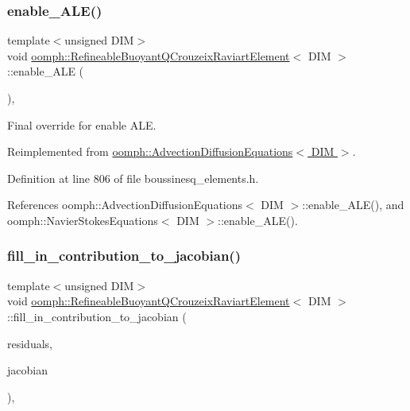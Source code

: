\subsubsection{\texorpdfstring{enable\+\_\+\+A\+L\+E()}{enable\_ALE()}}
{\footnotesize\ttfamily template$<$unsigned D\+IM$>$ \\
void \hyperlink{classoomph_1_1RefineableBuoyantQCrouzeixRaviartElement}{oomph\+::\+Refineable\+Buoyant\+Q\+Crouzeix\+Raviart\+Element}$<$ D\+IM $>$\+::enable\+\_\+\+A\+LE (\begin{DoxyParamCaption}{ }\end{DoxyParamCaption})\hspace{0.3cm}{\ttfamily [inline]}, {\ttfamily [virtual]}}



Final override for enable A\+LE. 



Reimplemented from \hyperlink{classoomph_1_1AdvectionDiffusionEquations_a949dd5a3eb9803c993c1f4506cfd5d82}{oomph\+::\+Advection\+Diffusion\+Equations$<$ D\+I\+M $>$}.



Definition at line 806 of file boussinesq\+\_\+elements.\+h.



References oomph\+::\+Advection\+Diffusion\+Equations$<$ D\+I\+M $>$\+::enable\+\_\+\+A\+L\+E(), and oomph\+::\+Navier\+Stokes\+Equations$<$ D\+I\+M $>$\+::enable\+\_\+\+A\+L\+E().

\mbox{\label{classoomph_1_1RefineableBuoyantQCrouzeixRaviartElement_a0d05a727999c7f102f3fe2bacce38f6b}} 
\subsubsection{\texorpdfstring{fill\+\_\+in\+\_\+contribution\+\_\+to\+\_\+jacobian()}{fill\_in\_contribution\_to\_jacobian()}}
{\footnotesize\ttfamily template$<$unsigned D\+IM$>$ \\
void \hyperlink{classoomph_1_1RefineableBuoyantQCrouzeixRaviartElement}{oomph\+::\+Refineable\+Buoyant\+Q\+Crouzeix\+Raviart\+Element}$<$ D\+IM $>$\+::fill\+\_\+in\+\_\+contribution\+\_\+to\+\_\+jacobian (\begin{DoxyParamCaption}\item[{\hyperlink{classoomph_1_1Vector}{Vector}$<$ double $>$ \&}]{residuals,  }\item[{\hyperlink{classoomph_1_1DenseMatrix}{Dense\+Matrix}$<$ double $>$ \&}]{jacobian }\end{DoxyParamCaption})\hspace{0.3cm}{\ttfamily [inline]}, {\ttfamily [virtual]}}



